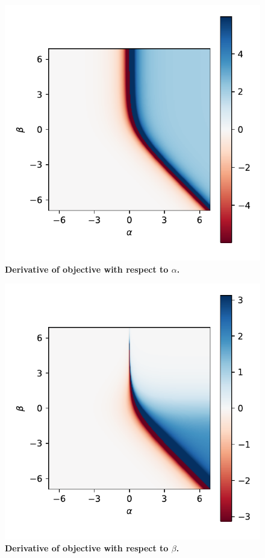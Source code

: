 \documentclass{article}
\begin{document}
\begin{figure}[!ht]
\centering
\includegraphics{figure3-derivative_alpha}
\caption{\textbf{Derivative of objective with respect to \(\alpha\).}}
\label{figure:derivative-alpha}
\end{figure}

\begin{figure}[!ht]
\centering
\includegraphics{figure4-derivative_beta}
\caption{\textbf{Derivative of objective with respect to \(\beta\).}}
\label{figure:derivative-beta}
\end{figure}
\end{document}
